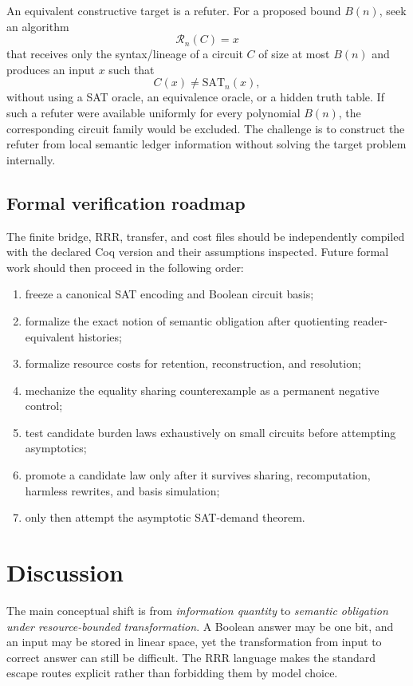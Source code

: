 \documentclass[11pt]{article}
\newcommand{\SAT}{\mathrm{SAT}}
\begin{document}
An equivalent constructive target is a refuter. For a proposed bound $B(n)$, seek an algorithm
\[
\mathcal R_n(C)=x
\]
that receives only the syntax/lineage of a circuit $C$ of size at most $B(n)$ and produces an input $x$ such that
\[
C(x)\neq\SAT_n(x),
\]
without using a SAT oracle, an equivalence oracle, or a hidden truth table. If such a refuter were available uniformly for every polynomial $B(n)$, the corresponding circuit family would be excluded. The challenge is to construct the refuter from local semantic ledger information without solving the target problem internally.

\subsection{Formal verification roadmap}

The finite bridge, RRR, transfer, and cost files should be independently compiled with the declared Coq version and their assumptions inspected. Future formal work should then proceed in the following order:
\begin{enumerate}
  \item freeze a canonical SAT encoding and Boolean circuit basis;
  \item formalize the exact notion of semantic obligation after quotienting reader-equivalent histories;
  \item formalize resource costs for retention, reconstruction, and resolution;
  \item mechanize the equality sharing counterexample as a permanent negative control;
  \item test candidate burden laws exhaustively on small circuits before attempting asymptotics;
  \item promote a candidate law only after it survives sharing, recomputation, harmless rewrites, and basis simulation;
  \item only then attempt the asymptotic SAT-demand theorem.
\end{enumerate}

\section{Discussion}

The main conceptual shift is from \emph{information quantity} to \emph{semantic obligation under resource-bounded transformation}. A Boolean answer may be one bit, and an input may be stored in linear space, yet the transformation from input to correct answer can still be difficult. The RRR language makes the standard escape routes explicit rather than forbidding them by model choice.
\end{document}
